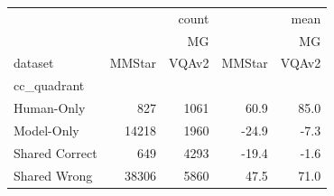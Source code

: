 \begin{tabular}{lrrrr}
\toprule
 & \multicolumn{2}{r}{count} & \multicolumn{2}{r}{mean} \\
 & \multicolumn{2}{r}{MG} & \multicolumn{2}{r}{MG} \\
dataset & MMStar & VQAv2 & MMStar & VQAv2 \\
cc_quadrant &  &  &  &  \\
\midrule
Human-Only & 827 & 1061 & 60.9 & 85.0 \\
Model-Only & 14218 & 1960 & -24.9 & -7.3 \\
Shared Correct & 649 & 4293 & -19.4 & -1.6 \\
Shared Wrong & 38306 & 5860 & 47.5 & 71.0 \\
\bottomrule
\end{tabular}
